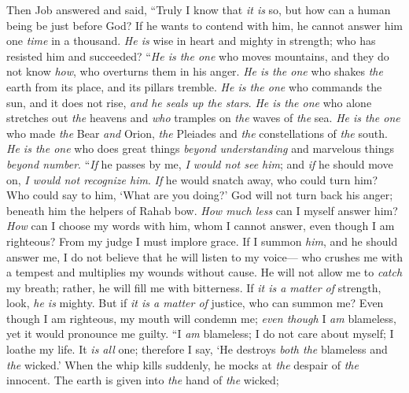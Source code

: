 \begin{biblechapter} %
 Then Job answered and said,
\verse “Truly I know that \textit{it is} so, 
but how can a human being be just before God?
\verse If he wants to contend with him, 
he cannot answer him one \textit{time} in a thousand.
\verse \textit{He is} wise in heart and mighty in strength; 
who has resisted him and succeeded?
\verse “\textit{He is the one} who moves mountains, and they do not know \textit{how}, 
who overturns them in his anger.
\verse \textit{He is the one} who shakes \textit{the} earth from its place, 
and its pillars tremble.
\verse \textit{He is the one} who commands the sun, and it does not rise, 
\textit{and he seals up the stars}.
\verse \textit{He is the one} who alone stretches out \textit{the} heavens 
and \textit{who} tramples on \textit{the} waves of \textit{the} sea.
\verse \textit{He is the one} who made \textit{the} Bear \textit{and} Orion, 
\textit{the} Pleiades and \textit{the} constellations of \textit{the} south.
\verse \textit{He is the one} who does great things \textit{beyond understanding} 
and marvelous things \textit{beyond number}.
\verse “\textit{If} he passes by me, \textit{I would not see him}; 
and \textit{if} he should move on, \textit{I would not recognize him}.
\verse \textit{If} he would snatch away, who could turn him? 
Who could say to him, ‘What are you doing?’
\verse God will not turn back his anger; 
beneath him the helpers of Rahab bow.
\verse \textit{How much less} can I myself answer him? 
\textit{How} can I choose my words with him,
\verse whom I cannot answer, even though I am righteous? 
From my judge I must implore grace.
\verse If I summon \textit{him}, and he should answer me, 
I do not believe that he will listen to my voice—
\verse who crushes me with a tempest 
and multiplies my wounds without cause.
\verse He will not allow me to \textit{catch} my breath; 
rather, he will fill me with bitterness.
\verse If \textit{it is a matter of} strength, look, \textit{he is} mighty. 
But if \textit{it is a matter of} justice, who can summon me?
\verse Even though I am righteous, my mouth will condemn me; 
\textit{even though} I \textit{am} blameless, yet it would pronounce me guilty.
\verse “I \textit{am} blameless; I do not care about myself; 
I loathe my life.
\verse It \textit{is all} one; therefore I say, 
‘He destroys \textit{both the} blameless and \textit{the} wicked.’
\verse When the whip kills suddenly, 
he mocks at \textit{the} despair of \textit{the} innocent.
\verse The earth is given into \textit{the} hand of \textit{the} wicked; 

\end{biblechapter}
